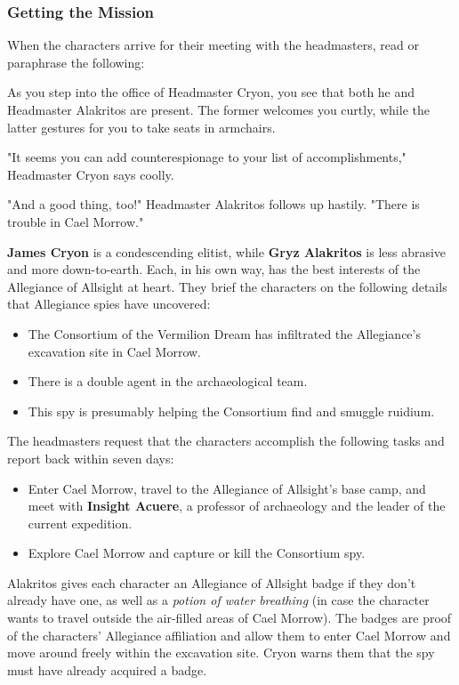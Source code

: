 \documentclass[10pt,a4paper,twoside,fancy,bg=print,twocolumn,openany,nodeprecatedcode]{dndbook}
\begin{document}
\subsubsection{Getting the Mission}
When the characters arrive for their meeting with the headmasters, read or paraphrase the following:

\begin{DndReadAloud}{}
As you step into the office of Headmaster Cryon, you see that both he and Headmaster Alakritos are present. The former welcomes you curtly, while the latter gestures for you to take seats in armchairs.

"It seems you can add counterespionage to your list of accomplishments," Headmaster Cryon says coolly.

"And a good thing, too!" Headmaster Alakritos follows up hastily. "There is trouble in Cael Morrow."

\end{DndReadAloud}

\textbf{James Cryon} is a condescending elitist, while \textbf{Gryz Alakritos} is less abrasive and more down-to-earth. Each, in his own way, has the best interests of the Allegiance of Allsight at heart. They brief the characters on the following details that Allegiance spies have uncovered:


\begin{itemize}
\item The Consortium of the Vermilion Dream has infiltrated the Allegiance's excavation site in Cael Morrow.
\item There is a double agent in the archaeological team.
\item This spy is presumably helping the Consortium find and smuggle ruidium.
\end{itemize}

The headmasters request that the characters accomplish the following tasks and report back within seven days:


\begin{itemize}
\item Enter Cael Morrow, travel to the Allegiance of Allsight's base camp, and meet with \textbf{Insight Acuere}, a professor of archaeology and the leader of the current expedition.
\item Explore Cael Morrow and capture or kill the Consortium spy.
\end{itemize}

Alakritos gives each character an Allegiance of Allsight badge if they don't already have one, as well as a \textit{potion of water breathing} (in case the character wants to travel outside the air-filled areas of Cael Morrow). The badges are proof of the characters' Allegiance affiliation and allow them to enter Cael Morrow and move around freely within the excavation site. Cryon warns them that the spy must have already acquired a badge.
\end{document}
